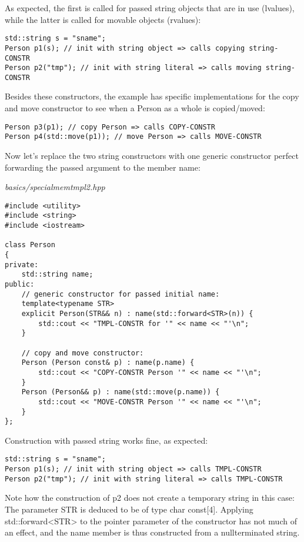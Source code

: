 As expected, the first is called for passed string objects that are in use (lvalues), while the latter is called for movable objects (rvalues):

\begin{lstlisting}[style=styleCXX]
std::string s = "sname";
Person p1(s); // init with string object => calls copying string-CONSTR
Person p2("tmp"); // init with string literal => calls moving string-CONSTR
\end{lstlisting}

Besides these constructors, the example has specific implementations for the copy and move constructor to see when a Person as a whole is copied/moved:

\begin{lstlisting}[style=styleCXX]
Person p3(p1); // copy Person => calls COPY-CONSTR
Person p4(std::move(p1)); // move Person => calls MOVE-CONSTR
\end{lstlisting}

Now let’s replace the two string constructors with one generic constructor perfect forwarding the passed argument to the member name:

\noindent
\textit{basics/specialmemtmpl2.hpp}
\begin{lstlisting}[style=styleCXX]
#include <utility>
#include <string>
#include <iostream>

class Person
{
private:
	std::string name;
public:
	// generic constructor for passed initial name:
	template<typename STR>
	explicit Person(STR&& n) : name(std::forward<STR>(n)) {
		std::cout << "TMPL-CONSTR for '" << name << "'\n";
	}

	// copy and move constructor:
	Person (Person const& p) : name(p.name) {
		std::cout << "COPY-CONSTR Person '" << name << "'\n";
	}
	Person (Person&& p) : name(std::move(p.name)) {
		std::cout << "MOVE-CONSTR Person '" << name << "'\n";
	}
};
\end{lstlisting}

Construction with passed string works fine, as expected:

\begin{lstlisting}[style=styleCXX]
std::string s = "sname";
Person p1(s); // init with string object => calls TMPL-CONSTR
Person p2("tmp"); // init with string literal => calls TMPL-CONSTR
\end{lstlisting}

Note how the construction of p2 does not create a temporary string in this case: The parameter STR is deduced to be of type char const[4]. Applying std::forward<STR> to the pointer parameter of the constructor has not much of an effect, and the name member is thus constructed from a nullterminated string.


